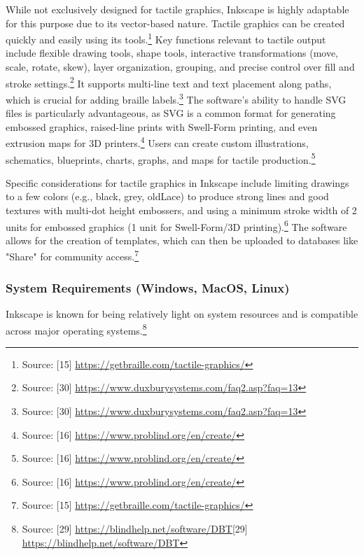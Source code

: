 While not exclusively designed for tactile graphics, Inkscape is highly adaptable for this purpose due to its vector-based nature. Tactile graphics can be created quickly and easily using its tools.\footnote{Source: [15] \url{https://getbraille.com/tactile-graphics/}} Key functions relevant to tactile output include flexible drawing tools, shape tools, interactive transformations (move, scale, rotate, skew), layer organization, grouping, and precise control over fill and stroke settings.\footnote{Source: [30] \url{https://www.duxburysystems.com/faq2.asp?faq=13}} It supports multi-line text and text placement along paths, which is crucial for adding braille labels.\footnote{Source: [30] \url{https://www.duxburysystems.com/faq2.asp?faq=13}} The software's ability to handle SVG files is particularly advantageous, as SVG is a common format for generating embossed graphics, raised-line prints with Swell-Form printing, and even extrusion maps for 3D printers.\footnote{Source: [16] \url{https://www.problind.org/en/create/}} Users can create custom illustrations, schematics, blueprints, charts, graphs, and maps for tactile production.\footnote{Source: [16] \url{https://www.problind.org/en/create/}}

Specific considerations for tactile graphics in Inkscape include limiting drawings to a few colors (e.g., black, grey, oldLace) to produce strong lines and good textures with multi-dot height embossers, and using a minimum stroke width of 2 units for embossed graphics (1 unit for Swell-Form/3D printing).\footnote{Source: [16] \url{https://www.problind.org/en/create/}} The software allows for the creation of templates, which can then be uploaded to databases like "Share" for community access.\footnote{Source: [15] \url{https://getbraille.com/tactile-graphics/}}

\subsubsection{System Requirements (Windows, MacOS, Linux)}

Inkscape is known for being relatively light on system resources and is compatible across major operating systems.\footnote{Source: [29] \url{https://blindhelp.net/software/DBT}[29] \url{https://blindhelp.net/software/DBT}}

